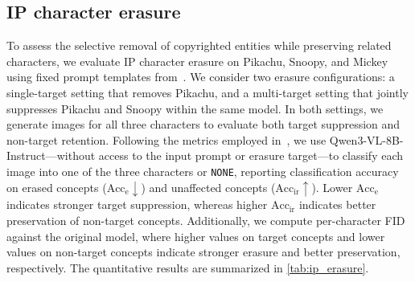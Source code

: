 \subsection{IP character erasure}
\label{sec:exp_ip}

To assess the selective removal of copyrighted entities while preserving related characters,
we evaluate IP character erasure on Pikachu, Snoopy, and Mickey using fixed prompt templates from~\cite{pmlr-v139-radford21a}.
We consider two erasure configurations: a single-target setting that removes Pikachu, and a multi-target setting that jointly suppresses Pikachu and Snoopy within the same model. 
In both settings, we generate images for all three characters to evaluate both target suppression and non-target retention. 
Following the metrics employed in~\cite{pmlr-v267-gao25j}, we use Qwen3-VL-8B-Instruct—without access to the input prompt or erasure target—to classify each image into one of the three characters or \texttt{NONE}, reporting classification accuracy on erased concepts ($\mathrm{Acc}_{\mathrm{e}}\downarrow$) and unaffected concepts ($\mathrm{Acc}_{\mathrm{ir}}\uparrow$).
Lower $\mathrm{Acc}_{\mathrm{e}}$ indicates stronger target suppression, whereas higher $\mathrm{Acc}_{\mathrm{ir}}$ indicates better preservation of non-target concepts. 
Additionally, we compute per-character FID against the original model, where higher values on target concepts and lower values on non-target concepts indicate stronger erasure and better preservation, respectively. 
The quantitative results are summarized in \cref{tab:ip_erasure}.

